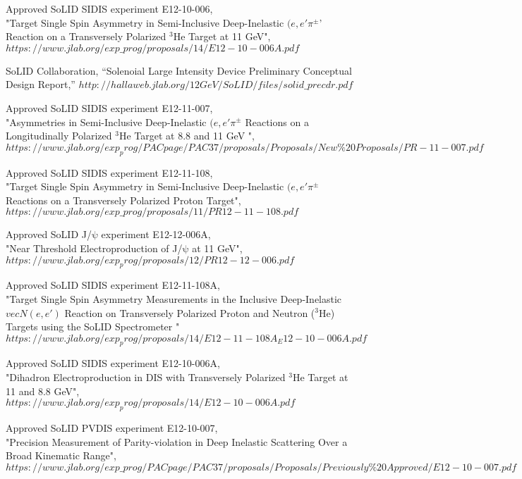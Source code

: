\begin{thebibliography}{}
  Approved SoLID SIDIS experiment E12-10-006,\\
  "Target Single Spin Asymmetry in Semi-Inclusive Deep-Inelastic $(e,e'\pi^{\pm}$' Reaction on a Transversely Polarized $\mathrm{^{3}He}$ Target at 11 GeV",\\
$https://www.jlab.org/exp\_prog/proposals/14/E12-10-006A.pdf$


  SoLID Collaboration, ``Solenoial Large Intensity Device Preliminary Conceptual Design Report,''
  $http://hallaweb.jlab.org/12GeV/SoLID/files/solid\_precdr.pdf$

  Approved SoLID SIDIS experiment E12-11-007,\\
"Asymmetries in Semi-Inclusive Deep-Inelastic  $(e,e'\pi^{\pm}$ Reactions on a Longitudinally Polarized $\mathrm{^{3}He}$ Target at 8.8 and 11 GeV ",\\
$https://www.jlab.org/exp_prog/PACpage/PAC37/proposals/Proposals/New\%20Proposals/PR-11-007.pdf$

  Approved SoLID SIDIS experiment E12-11-108,\\
"Target Single Spin Asymmetry in Semi-Inclusive Deep-Inelastic $(e,e'\pi^{\pm}$ Reactions on a Transversely Polarized Proton Target",\\
$https://www.jlab.org/exp\_prog/proposals/11/PR12-11-108.pdf$

  Approved SoLID J/$\mathrm{\psi}$ experiment E12-12-006A,\\
  "Near Threshold Electroproduction of J/$\mathrm{\psi}$ at 11 GeV",\\
$https://www.jlab.org/exp_prog/proposals/12/PR12-12-006.pdf$

   Approved SoLID SIDIS experiment E12-11-108A,\\
"Target Single Spin Asymmetry Measurements in the Inclusive Deep-Inelastic $vec{N}(e,e')$ Reaction on Transversely Polarized Proton and Neutron ($\mathrm{^{3}He}$) Targets using the SoLID Spectrometer "\\
$https://www.jlab.org/exp_prog/proposals/14/E12-11-108A_E12-10-006A.pdf$

  Approved SoLID SIDIS experiment E12-10-006A,\\
  "Dihadron Electroproduction in DIS with  Transversely Polarized $\mathrm{^{3}He}$ Target at 11 and 8.8 GeV",\\
$https://www.jlab.org/exp_prog/proposals/14/E12-10-006A.pdf$

  Approved SoLID PVDIS experiment E12-10-007,\\
  "Precision Measurement of Parity-violation in Deep Inelastic Scattering Over a Broad Kinematic Range",\\
  $https://www.jlab.org/exp\_prog/PACpage/PAC37/proposals/Proposals/Previously\%20Approved/E12-10-007.pdf$

\end{thebibliography}
